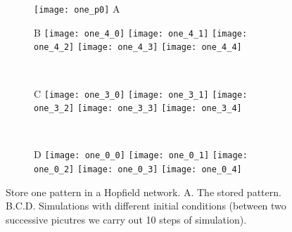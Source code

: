 \newpage
\null
\vfill
\begin{figure}[H]
  \centering
  \begin{subfigure}{0.28\textwidth}
    \centering
    \texttt{[image: one\_p0]}
    \textsf{A}
  \end{subfigure}
  \hspace{0.7em}
  \begin{minipage}{0.62\textwidth}
    \begin{subfigure}{\textwidth}
      \textsf{B}
      \centering
      \texttt{[image: one\_4\_0]}
      \texttt{[image: one\_4\_1]}
      \texttt{[image: one\_4\_2]}
      \texttt{[image: one\_4\_3]}
      \texttt{[image: one\_4\_4]}
    \end{subfigure}\\[0.6em]
    \begin{subfigure}{\textwidth}
      \textsf{C}
      \centering
      \texttt{[image: one\_3\_0]}
      \texttt{[image: one\_3\_1]}
      \texttt{[image: one\_3\_2]}
      \texttt{[image: one\_3\_3]}
      \texttt{[image: one\_3\_4]}
    \end{subfigure}\\[0.6em]
    \begin{subfigure}{\textwidth}
      \textsf{D}
      \centering
      \texttt{[image: one\_0\_0]}
      \texttt{[image: one\_0\_1]}
      \texttt{[image: one\_0\_2]}
      \texttt{[image: one\_0\_3]}
      \texttt{[image: one\_0\_4]}
    \end{subfigure}
  \end{minipage}
  \vspace{1.2em}
  \caption{Store one pattern in a Hopfield network.
           \textsf{A.} The stored pattern.
           \textsf{B.C.D.} Simulations with different initial conditions
           (between two successive picutres we carry out 10 steps of
           simulation).}
  \label{fig: Hopfield_one}
\end{figure}

\vfill

